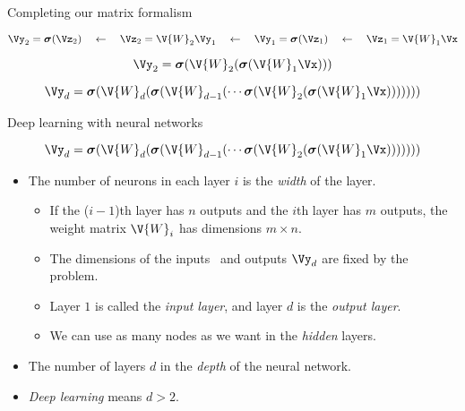 \documentclass[9pt]{beamer}
\newcommand\bsigma{\boldsymbol{\sigma}}
\begin{document}
\begin{frame}{Completing our matrix formalism}
\begin{center}
	\small
\end{center}

\[  \Vy_2 = \bsigma(\Vz_2) \quad\leftarrow\quad
	\Vz_2 = \V{W}_2\Vy_1 \quad\leftarrow\quad
	\Vy_1 = \bsigma(\Vz_1) \quad\leftarrow\quad
	\Vz_1 = \V{W}_1\Vx	 \]

\[ \Vy_2 = \bsigma(\V{W}_2(\bsigma(\V{W}_1\Vx))) \]

\[ \Vy_d = \bsigma(\V{W}_d(\bsigma(\V{W}_{d-1}(\cdots\bsigma(\V{W}_2(\bsigma(\V{W}_1\Vx))))))) \]

\end{frame}

\begin{frame}{Deep learning with neural networks}

\[ \Vy_d = \bsigma(\V{W}_d(\bsigma(\V{W}_{d-1}(\cdots\bsigma(\V{W}_2(\bsigma(\V{W}_1\Vx))))))) \]

\bigskip
\begin{itemize}
	\item The number of neurons in each layer $i$ is the \emph{width} of the layer.
	\begin{itemize}
		\item If the ($i-1$)th layer has $n$ outputs and the $i$th layer has $m$ outputs, the weight matrix $\V{W}_i$ has dimensions $m\times n$.
		\item The dimensions of the inputs \Vx\ and outputs $\Vy_d$ are fixed by the problem.
		\item Layer $1$ is called the \emph{input layer}, and layer $d$ is the \emph{output layer}.
		\item We can use as many nodes as we want in the \emph{hidden} layers.
	\end{itemize}
	\item<2-> The number of layers $d$ in the \emph{depth} of the neural network.
	\item<3-> \emph{Deep learning} means $d>2$.
\end{itemize}
	
\end{frame}
\end{document}
